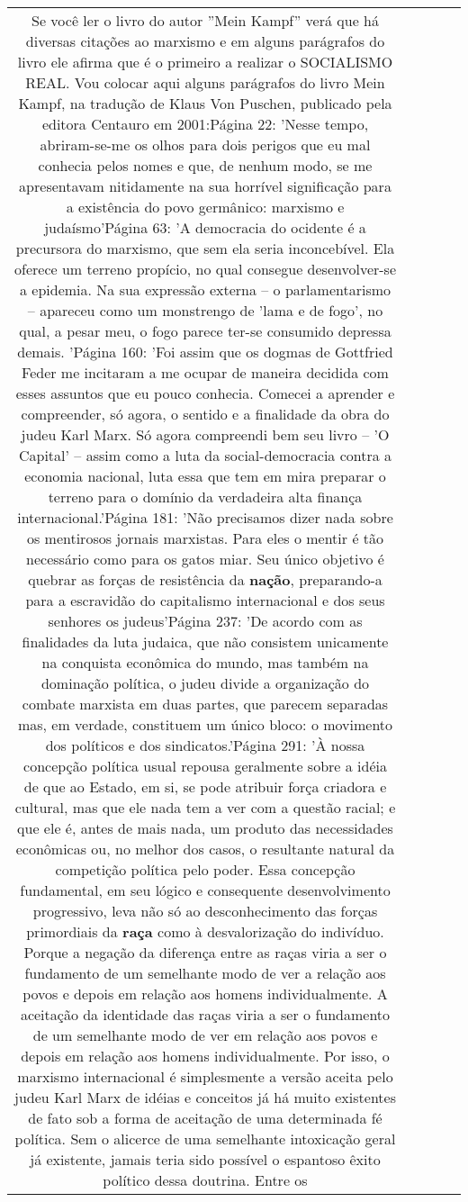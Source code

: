 \documentclass[11pt]{article}
\newlength\mylength
\begin{document}
\begin{center}
\begin{longtable}{|C{.65\mylength}|C{.30\mylength}|C{.12\mylength}|C{.12\mylength}|C{.12\mylength}|}
  \small Se você ler o livro do autor ''Mein Kampf'' verá que há diversas citações ao marxismo e em alguns parágrafos do livro ele afirma que é o primeiro a realizar o SOCIALISMO REAL. Vou colocar aqui alguns parágrafos do livro Mein Kampf, na tradução de Klaus Von Puschen, publicado pela editora Centauro em 2001:Página 22: 'Nesse tempo, abriram-se-me os olhos para dois perigos que eu mal conhecia pelos nomes e que, de nenhum modo, se me apresentavam nitidamente na sua horrível significação para a existência do povo germânico: marxismo e judaísmo'Página 63: 'A democracia do ocidente é a precursora do marxismo, que sem ela seria inconcebível. Ela oferece um terreno propício, no qual consegue desenvolver-se a epidemia. Na sua expressão externa – o parlamentarismo – apareceu como um monstrengo de 'lama e de fogo', no qual, a pesar meu, o fogo parece ter-se consumido depressa demais. 'Página 160: 'Foi assim que os dogmas de Gottfried Feder me incitaram a me ocupar de maneira decidida com esses assuntos que eu pouco conhecia. Comecei a aprender e compreender, só agora, o sentido e a finalidade da obra do judeu Karl Marx. Só agora compreendi bem seu livro – 'O Capital' – assim como a luta da social-democracia contra a economia nacional, luta essa que tem em mira preparar o terreno para o domínio da verdadeira alta finança internacional.'Página 181: 'Não precisamos dizer nada sobre os mentirosos jornais marxistas. Para eles o mentir é tão necessário como para os gatos miar. Seu único objetivo é quebrar as forças de resistência da \textbf{nação}, preparando-a para a escravidão do capitalismo internacional e dos seus senhores os judeus'Página 237: 'De acordo com as finalidades da luta judaica, que não consistem unicamente na conquista econômica do mundo, mas também na dominação política, o judeu divide a organização do combate marxista em duas partes, que parecem separadas mas, em verdade, constituem um único bloco: o movimento dos políticos e dos sindicatos.'Página 291: 'À nossa concepção política usual repousa geralmente sobre a idéia de que ao Estado, em si, se pode atribuir força criadora e cultural, mas que ele nada tem a ver com a questão racial; e que ele é, antes de mais nada, um produto das necessidades econômicas ou, no melhor dos casos, o resultante natural da competição política pelo poder. Essa concepção fundamental, em seu lógico e consequente desenvolvimento progressivo, leva não só ao desconhecimento das forças primordiais da \textbf{raça} como à desvalorização do indivíduo. Porque a negação da diferença entre as raças viria a ser o fundamento de um semelhante modo de ver a relação aos povos e depois em relação aos homens individualmente. A aceitação da identidade das raças viria a ser o fundamento de um semelhante modo de ver em relação aos povos e depois em relação aos homens individualmente. Por isso, o marxismo internacional é simplesmente  a versão aceita pelo judeu Karl Marx de idéias e conceitos já há muito existentes de fato sob a forma de aceitação de uma determinada fé política. Sem o alicerce de uma semelhante intoxicação geral já existente, jamais teria sido possível o espantoso êxito político dessa doutrina. Entre os 
\end{longtable}
\end{center}
\end{document}
